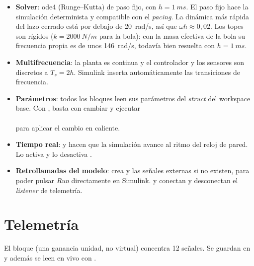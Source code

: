\begin{itemize}
  \item \textbf{Solver}: ode4 (Runge--Kutta) de paso fijo, con $h=\SI{1}{ms}$. El paso fijo hace la simulación determinista y compatible con el \emph{pacing}. La dinámica más rápida del lazo cerrado está por debajo de \SI{20}{rad/s}, así que $\omega h\approx0{,}02$. Los topes son rígidos ($k=\SI{2000}{N/m}$ para la bola): con la masa efectiva de la bola su frecuencia propia es de unos \SI{146}{rad/s}, todavía bien resuelta con $h=\SI{1}{ms}$.
  \item \textbf{Multifrecuencia}: la planta es continua y el controlador y los sensores son discretos a $T_s=2h$. Simulink inserta automáticamente las transiciones de frecuencia.
  \item \textbf{Parámetros}: todos los bloques leen sus parámetros del \emph{struct}  del workspace base. Con , basta con cambiar  y ejecutar\\ \\ para aplicar el cambio en caliente.
  \item \textbf{Tiempo real}:  y  hacen que la simulación avance al ritmo del reloj de pared. Lo activa  y lo desactiva .
  \item \textbf{Retrollamadas del modelo}:  crea  y las señales externas si no existen, para poder pulsar \emph{Run} directamente en Simulink.  y  conectan y desconectan el \emph{listener} de telemetría.
\end{itemize}

\section{Telemetría}

El bloque  (una ganancia unidad, no virtual) concentra 12 señales. Se guardan en  y además se leen en vivo con .

